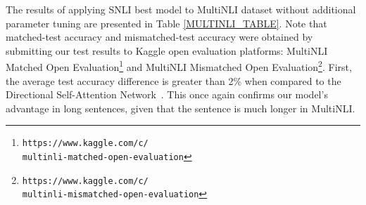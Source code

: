 \documentclass[11pt,letterpaper]{article}
\begin{document}
\begin{table*}[t]
\centering
{}
\caption{\label{MULTINLI_TABLE} \textbf{Experimental results of different models on MultiNLI data.} SNLI Mix : use of SNLI training dataset.  : number of parameters (excluding word embedding part).}
\end{table*}

The results of applying SNLI best model to MultiNLI dataset without additional parameter tuning are presented in Table \ref{MULTINLI_TABLE}. Note that matched-test accuracy and mismatched-test accuracy were obtained by submitting our
test results to Kaggle open evaluation platforms: MultiNLI
Matched Open Evaluation\footnote{\scriptsize {\tt https://www.kaggle.com/c/\\ \-\hspace{.75cm} multinli-matched-open-evaluation}} and MultiNLI Mismatched Open
Evaluation\footnote{\scriptsize {\tt https://www.kaggle.com/c/ \\ \-\hspace{.75cm} multinli-mismatched-open-evaluation}}. First, the average test accuracy difference is greater than 2\% when compared to the Directional Self-Attention Network~\citep{DiSAN}. This once again confirms our model's advantage in long sentences, given that the sentence is much longer in MultiNLI.
\end{document}
